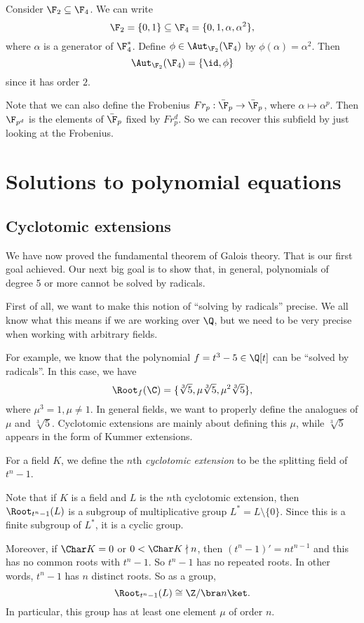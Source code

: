 \documentclass[a4paper]{article}
\begin{document}
\begin{eg}
  Consider $\F_2 \subseteq \F_4$. We can write
  \[
    \F_2 = \{0, 1\} \subseteq \F_4 = \{0, 1, \alpha, \alpha^2\},
  \]
  where $\alpha$ is a generator of $\F_4^*$. Define $\phi \in \Aut_{\F_2}(\F_4)$ by $\phi(\alpha) = \alpha^2$. Then
  \[
    \Aut_{\F_2}(\F_4) = \{\id, \phi\}
  \]
  since it has order $2$.
\end{eg}
Note that we can also define the Frobenius $Fr_p: \bar{\F}_p \to \bar{\F}_p$, where $\alpha \mapsto \alpha^p$. Then $\F_{p^d}$ is the elements of $\bar{\F}_p$ fixed by $Fr_p^d$. So we can recover this subfield by just looking at the Frobenius.

\section{Solutions to polynomial equations}
\subsection{Cyclotomic extensions}
We have now proved the fundamental theorem of Galois theory. That is our first goal achieved. Our next big goal is to show that, in general, polynomials of degree 5 or more cannot be solved by radicals.

First of all, we want to make this notion of ``solving by radicals'' precise. We all know what this means if we are working over $\Q$, but we need to be very precise when working with arbitrary fields.

For example, we know that the polynomial $f = t^3 - 5 \in \Q[t]$ can be ``solved by radicals''. In this case, we have
\[
  \Root_f(\C) = \{\sqrt[3]{5}, \mu \sqrt[3]{5}, \mu^2\sqrt[3]{5}\},
\]
where $\mu^3 = 1, \mu \not= 1$. In general fields, we want to properly define the analogues of $\mu$ and $\sqrt[3]{5}$. Cyclotomic extensions are mainly about defining this $\mu$, while $\sqrt[3]{5}$ appears in the form of Kummer extensions.

\begin{defi}
  For a field $K$, we define the $n$th \emph{cyclotomic extension} to be the splitting field of $t^n - 1$.
\end{defi}
Note that if $K$ is a field and $L$ is the $n$th cyclotomic extension, then $\Root_{t^n - 1}(L)$ is a subgroup of multiplicative group $L^* = L\setminus \{0\}$. Since this is a finite subgroup of $L^*$, it is a cyclic group.

Moreover, if $\Char K = 0$ or $0 < \Char K \nmid n$, then $(t^n - 1)' = nt^{n - 1}$ and this has no common roots with $t^n - 1$. So $t^n - 1$ has no repeated roots. In other words, $t^n - 1$ has $n$ distinct roots. So as a group,
\[
  \Root_{t^n - 1}(L) \cong \Z/\bra n\ket.
\]
In particular, this group has at least one element $\mu$ of order $n$.
\end{document}

